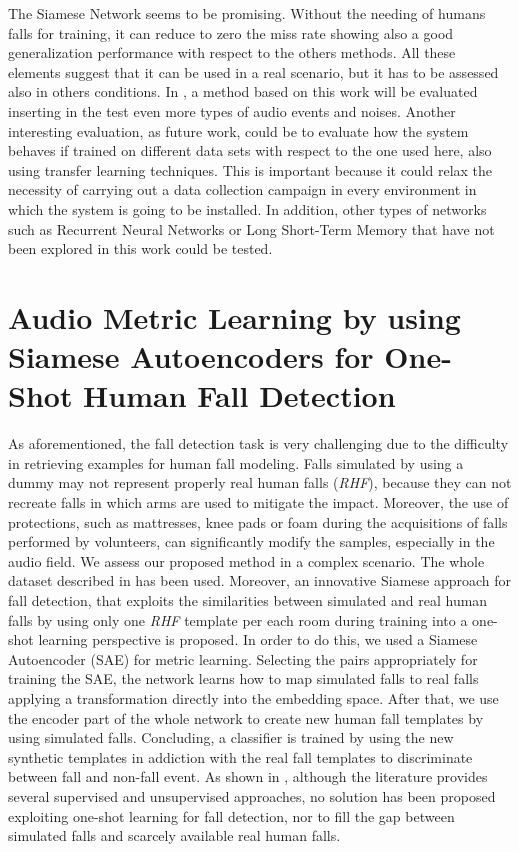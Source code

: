 The Siamese Network seems to be promising. Without the needing of humans falls for training, it can reduce to zero the miss rate showing also a good generalization performance with respect to the others methods. All these elements suggest that it can be used in a real scenario, but it has to be assessed also in others conditions.
In , a method based on this work will be evaluated inserting in the test even more types of audio events and noises.
Another interesting evaluation, as future work, could be to evaluate how the system behaves if trained on different data sets with respect to the one used here, also using transfer learning techniques. This is important because it could relax the necessity of carrying out a data collection campaign in every environment in which the system is going to be installed. In addition, other types of networks such as Recurrent Neural Networks or Long Short-Term Memory that have not been explored in this work could be tested.




\section{Audio Metric Learning by using Siamese Autoencoders for One-Shot Human Fall Detection}
\label{sec:siamese_one_shot}

As aforementioned, the fall detection task is very challenging due to the difficulty in retrieving examples for human fall modeling. Falls simulated by using a dummy may not represent properly real human falls (\textit{RHF}), because they can not recreate falls in which arms are used to mitigate the impact. Moreover, the use of protections, such as mattresses, knee pads or foam during the acquisitions of falls performed by volunteers, can significantly modify the samples, especially in the audio field. 
We assess our proposed method in a complex scenario. The whole dataset described in  has been used.
Moreover, an innovative Siamese approach for fall detection, that exploits the similarities between simulated and real human falls by using only one \textit{RHF} template per each room during training into a one-shot learning perspective is proposed.
In order to do this, we used a Siamese Autoencoder (SAE) for metric learning. Selecting the pairs appropriately for training the SAE, the network learns how to map simulated falls to real falls applying a transformation directly into the embedding space. After that, we use the encoder part of the whole network to create new human fall templates by using simulated falls. Concluding, a classifier is trained by using the new synthetic templates in addiction with the real fall templates to discriminate between fall and non-fall event.
As shown in , although the literature provides several supervised and unsupervised approaches, no solution has been proposed exploiting one-shot learning for fall detection, nor to fill the gap between simulated falls and scarcely available real human falls.


